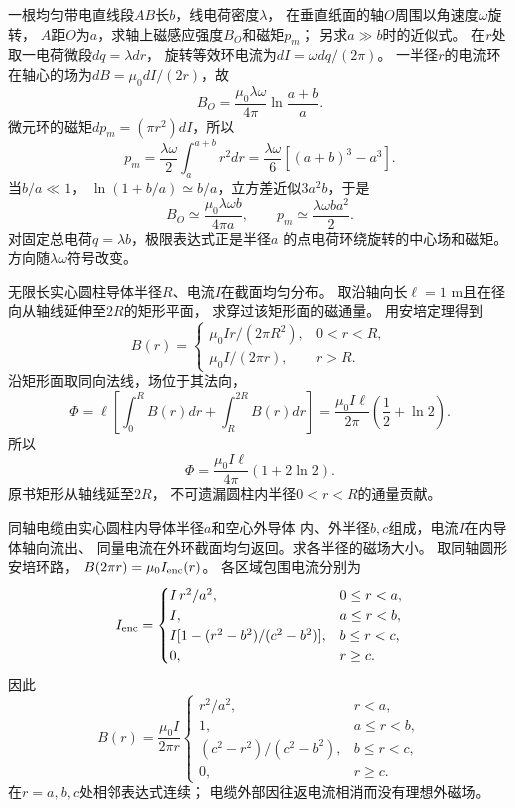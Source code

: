 
\problemtext 一根均匀带电直线段$AB$长$b$，线电荷密度$\lambda$，
在垂直纸面的轴$O$周围以角速度$\omega$旋转，
$A$距$O$为$a$，求轴上磁感应强度$B_O$和磁矩$p_m$；
另求$a\gg b$时的近似式。
\workings
在$r$处取一电荷微段$dq=\lambda dr$，
旋转等效环电流为$dI=\omega dq/(2\pi)$。
一半径$r$的电流环在轴心的场为$dB=\mu_0dI/(2r)$，故
\[
\boxed{B_O=\frac{\mu_0\lambda\omega}{4\pi}
\ln\frac{a+b}{a}}.
\]
微元环的磁矩$d p_m=(\pi r^2)dI$，所以
\[
\boxed{p_m=\frac{\lambda\omega}{2}\int_a^{a+b}r^2dr
=\frac{\lambda\omega}{6}[(a+b)^3-a^3]}.
\]
当$b/a\ll1$，
$\ln(1+b/a)\simeq b/a$，立方差近似$3a^2b$，于是
\[
\boxed{B_O\simeq\frac{\mu_0\lambda\omega b}{4\pi a},
\qquad p_m\simeq\frac{\lambda\omega ba^2}{2}}.
\]
\crosscheck 对固定总电荷$q=\lambda b$，极限表达式正是半径$a$
的点电荷环绕旋转的中心场和磁矩。方向随$\lambda\omega$符号改变。

\problemtext 无限长实心圆柱导体半径$R$、电流$I$在截面均匀分布。
取沿轴向长$\ell=1$ m且在径向从轴线延伸至$2R$的矩形平面，
求穿过该矩形面的磁通量。
\workings
用安培定理得到
\[
B(r)=
\begin{cases}
\mu_0Ir/(2\pi R^2),&0<r<R,\\
\mu_0I/(2\pi r),&r>R.
\end{cases}
\]
沿矩形面取同向法线，场位于其法向，
\[
\Phi=\ell\left[\int_0^RB(r)dr+\int_R^{2R}B(r)dr\right]
=\frac{\mu_0I\ell}{2\pi}
\left(\frac12+\ln2\right).
\]
所以
\[
\boxed{\Phi=\frac{\mu_0I\ell}{4\pi}(1+2\ln2)}.
\]
\crosscheck 原书矩形从轴线延至$2R$，
不可遗漏圆柱内半径$0<r<R$的通量贡献。

\problemtext 同轴电缆由实心圆柱内导体半径$a$和空心外导体
内、外半径$b,c$组成，电流$I$在内导体轴向流出、
同量电流在外环截面均匀返回。求各半径的磁场大小。
\workings
取同轴圆形安培环路，
$B(2\pi r)=\mu_0I_{\rm enc}(r)$。
各区域包围电流分别为
\[
I_{\rm enc}=
\begin{cases}
I\,r^2/a^2,&0\le r<a,\\
I,&a\le r<b,\\
I[1-(r^2-b^2)/(c^2-b^2)],&b\le r<c,\\
0,&r\ge c.
\end{cases}
\]
因此
\[
\boxed{B(r)=\frac{\mu_0 I}{2\pi r}
\begin{cases}
r^2/a^2,&r<a,\\
1,&a\le r<b,\\
(c^2-r^2)/(c^2-b^2),&b\le r<c,\\
0,&r\ge c.
\end{cases}}
\]
\crosscheck 在$r=a,b,c$处相邻表达式连续；
电缆外部因往返电流相消而没有理想外磁场。

